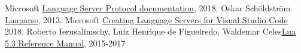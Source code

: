  Microsoft \href{https://microsoft.github.io/language-server-protocol/specification#initialize}{Language Server Protocol documentation}, 2018.
 Oskar Schöldström \href{https://oxyc.github.io/luaparse/}{Luaparse}, 2013.
 Microsoft \href{https://code.visualstudio.com/docs/extensions/example-language-server}{Creating Language Servers for Visual Studio Code} 2018.
 Roberto Ierusalimschy, Luiz Henrique de Figueiredo, Waldemar Celes\href{https://www.lua.org/manual/5.3/manual.html}{Lua 5.3 Reference Manual}, 2015-2017
